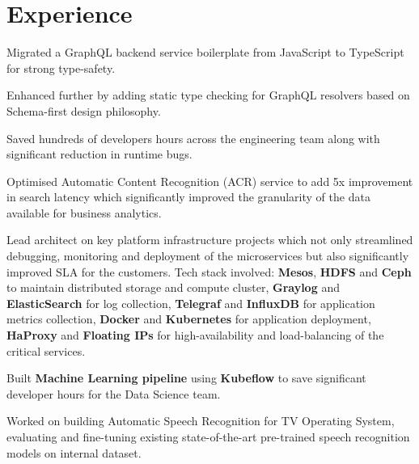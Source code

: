 \documentclass[]{deedy-resume-openfont}
\begin{document}
\hfill
\begin{minipage}[t]{0.66\textwidth} 


\section{Experience}
\vspace{\topsep}
\begin{tightemize}
\item Migrated a GraphQL backend service boilerplate from JavaScript to TypeScript for strong type-safety.
\item Enhanced further by adding static type checking for GraphQL resolvers based on Schema-first design philosophy.
\item Saved hundreds of developers hours across the engineering team along with significant reduction in runtime bugs.
\end{tightemize}
\sectionsep

\begin{tightemize}
\item Optimised Automatic Content Recognition (ACR) service to add 5x improvement in search latency which significantly improved the granularity of the data available for business analytics.
\item Lead architect on key platform infrastructure projects which not only streamlined debugging, monitoring and deployment of the microservices but also significantly improved SLA for the customers. Tech stack involved: \textbf{Mesos}, \textbf{HDFS} and \textbf{Ceph} to maintain distributed storage and compute cluster, \textbf{Graylog} and \textbf{ElasticSearch} for log collection, \textbf{Telegraf} and \textbf{InfluxDB} for application metrics collection, \textbf{Docker} and \textbf{Kubernetes} for application deployment, \textbf{HaProxy} and \textbf{Floating IPs} for high-availability and load-balancing of the critical services.
\item Built \textbf{Machine Learning pipeline} using \textbf{Kubeflow} to save significant developer hours for the Data Science team.
\item Worked on building Automatic Speech Recognition for TV Operating System, evaluating and fine-tuning existing state-of-the-art pre-trained speech recognition models on internal dataset.
\end{tightemize}
\sectionsep


\end{minipage}
\end{document}
